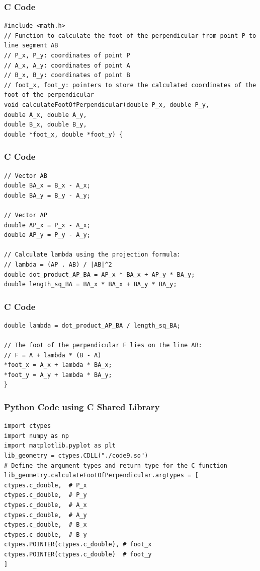\documentclass{beamer}
\begin{document}
\begin{frame}[fragile]
\frametitle{C Code}
\begin{lstlisting}
#include <math.h>
// Function to calculate the foot of the perpendicular from point P to line segment AB
// P_x, P_y: coordinates of point P
// A_x, A_y: coordinates of point A
// B_x, B_y: coordinates of point B
// foot_x, foot_y: pointers to store the calculated coordinates of the foot of the perpendicular
void calculateFootOfPerpendicular(double P_x, double P_y,
double A_x, double A_y,
double B_x, double B_y,
double *foot_x, double *foot_y) {
\end{lstlisting}
\end{frame}

\begin{frame}[fragile]
\frametitle{C Code}
\begin{lstlisting}
// Vector AB
double BA_x = B_x - A_x;
double BA_y = B_y - A_y;

// Vector AP
double AP_x = P_x - A_x;
double AP_y = P_y - A_y;

// Calculate lambda using the projection formula:
// lambda = (AP . AB) / |AB|^2
double dot_product_AP_BA = AP_x * BA_x + AP_y * BA_y;
double length_sq_BA = BA_x * BA_x + BA_y * BA_y;
\end{lstlisting}
\end{frame}

\begin{frame}[fragile]
\frametitle{C Code}
\begin{lstlisting}
double lambda = dot_product_AP_BA / length_sq_BA;

// The foot of the perpendicular F lies on the line AB:
// F = A + lambda * (B - A)
*foot_x = A_x + lambda * BA_x;
*foot_y = A_y + lambda * BA_y;
}
\end{lstlisting}
\end{frame}

\begin{frame}[fragile]
\frametitle{Python Code using C Shared Library}
\begin{lstlisting}
import ctypes
import numpy as np
import matplotlib.pyplot as plt
lib_geometry = ctypes.CDLL("./code9.so")
# Define the argument types and return type for the C function
lib_geometry.calculateFootOfPerpendicular.argtypes = [
ctypes.c_double,  # P_x
ctypes.c_double,  # P_y
ctypes.c_double,  # A_x
ctypes.c_double,  # A_y
ctypes.c_double,  # B_x
ctypes.c_double,  # B_y
ctypes.POINTER(ctypes.c_double), # foot_x
ctypes.POINTER(ctypes.c_double)  # foot_y
]
\end{lstlisting}
\end{frame}
\end{document}

